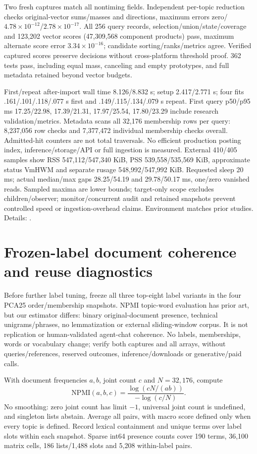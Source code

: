 \documentclass[11pt]{article}
\begin{document}
Two fresh captures match all nontiming fields. Independent per-topic reduction
checks original-vector sums/masses and directions, maximum errors
zero/$4.78\times10^{-12}$/$2.78\times10^{-17}$. All 256 query records,
selection/union/state/coverage and 123,202 vector scores (47,309,568 component
products) pass, maximum alternate score error $3.34\times10^{-16}$; candidate
sorting/ranks/metrics agree. Verified captured scores preserve decisions without
cross-platform threshold proof. 362 tests pass, including equal mass, canceling
and empty prototypes, and full metadata retained beyond vector budgets.

First/repeat after-import wall time 8.126/8.832 s; setup 2.417/2.771 s; four
fits .161/.101/.118/.077 s first and .149/.115/.134/.079 s repeat. First query
p50/p95 ms 17.25/22.98, 17.39/21.31, 17.97/25.54, 17.80/23.29 include
research validation/metrics. Metadata scans all 32,176 membership rows per
query: 8,237,056 row checks and 7,377,472 individual membership checks overall.
Admitted-hit counters are not total traversals. No efficient production posting
index, inference/storage/API or full ingestion is measured. External 410/405
samples show RSS 547,112/547,340 KiB, PSS 539,558/535,569 KiB, approximate
status VmHWM and separate rusage 548,992/547,992 KiB. Requested sleep 20 ms;
actual median/max gaps 28.25/54.19 and 29.78/50.17 ms, one/zero vanished reads.
Sampled maxima are lower bounds; target-only scope excludes children/observer;
monitor/concurrent audit and retained snapshots prevent controlled speed or
ingestion-overhead claims. Environment matches prior studies. Details:
.

\section{Frozen-label document coherence and reuse diagnostics}
Before further label tuning, freeze all three top-eight label variants in the
four PCA25 order/membership snapshots. NPMI topic-word evaluation has prior
art\cite{launpmicoherence}, but our estimator differs: binary original-document
presence, technical unigrams/phrases, no lemmatization or external sliding-window
corpus. It is not replication or human-validated agent-chat coherence. No
labels, memberships, words or vocabulary change; verify both captures and all
arrays, without queries/references, reserved outcomes, inference/downloads or
generative/paid calls.

With document frequencies $a,b$, joint count $c$ and $N=32{,}176$, compute
\[
\mathrm{NPMI}(a,b,c)=\frac{\log(cN/(ab))}{-\log(c/N)}.
\]
No smoothing: zero joint count has limit $-1$, universal joint count is undefined,
and singleton lists abstain. Average all pairs, with macro score defined only
when every topic is defined. Record lexical containment and unique terms over
label slots within each snapshot. Sparse int64 presence counts cover 190 terms,
36,100 matrix cells, 186 lists/1,488 slots and 5,208 within-label pairs.
\end{document}
